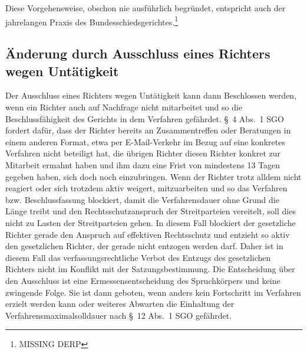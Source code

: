 Diese Vorgehensweise, obschon nie ausführlich begründet, entspricht auch der jahrelangen Praxis des Bundesschiedsgerichtes.\footnote{MISSING DERP}

\subsection{Änderung durch Ausschluss eines Richters wegen Untätigkeit}
\label{Zusammensetzung:Spruchkoerper:Untaetigkeit}
Der Ausschluss eines Richters wegen Untätigkeit kann dann Beschlossen werden, wenn ein Richter auch auf Nachfrage nicht mitarbeitet und so die Beschlussfähigkeit des Gerichts in dem Verfahren gefährdet.
\S~4 Abs.~1 SGO fordert dafür, dass der Richter bereits an Zusammentreffen oder Beratungen in einem anderen Format, etwa per E-Mail-Verkehr im Bezug auf eine konkretes Verfahren nicht beteiligt hat, die übrigen Richter diesen Richter konkret zur Mitarbeit ermahnt haben und ihm dazu eine Frist von mindestens 13 Tagen gegeben haben, sich doch noch einzubringen.
Wenn der Richter trotz alldem nicht reagiert oder sich trotzdem aktiv weigert, mitzuarbeiten und so das Verfahren bzw. Beschlussfassung blockiert, damit die Verfahrensdauer ohne Grund die Länge treibt und den Rechtsschutzanspruch der Streitparteien vereitelt, soll dies nicht zu Lasten der Streitparteien gehen.
In diesem Fall blockiert der gesetzliche Richter gerade den Anspruch auf effektiven Rechtsschutz und entzieht so aktiv den gesetzlichen Richter, der gerade nicht entzogen werden darf.
Daher ist in diesem Fall das verfassungsrechtliche Verbot des Entzugs des gesetzlichen Richters nicht im Konflikt mit der Satzungsbestimmung.
Die Entscheidung über den Ausschluss ist eine Ermessensentscheidung des Spruchkörpers und keine zwingende Folge.
Sie ist dann geboten, wenn anders kein Fortschritt im Verfahren erzielt werden kann oder weiteres Abwarten die Einhaltung der Verfahrensmaximalsolldauer nach \S~12 Abs.~1 SGO gefährdet.

